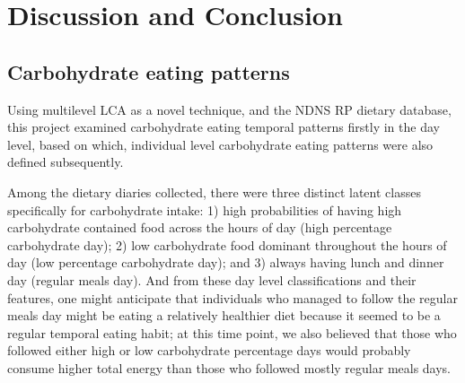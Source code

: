 
\chapter{Discussion and Conclusion} %

\label{Chapter 4} %







\section{Carbohydrate eating patterns}

Using multilevel LCA as a novel technique, and the NDNS RP dietary database, this project examined carbohydrate eating temporal patterns firstly in the day level, based on which, individual level carbohydrate eating patterns were also defined subsequently. 

Among the dietary diaries collected, there were three distinct latent classes specifically for carbohydrate intake: 1) high probabilities of having high carbohydrate contained food across the hours of day (high percentage carbohydrate day); 2) low carbohydrate food dominant throughout the hours of day (low percentage carbohydrate day); and 3) always having lunch and dinner day (regular meals day). And from these day level classifications and their features, one might anticipate that individuals who managed to follow the regular meals day might be eating a relatively healthier diet because it seemed to be a regular temporal eating habit; at this time point, we also believed that those who followed either high or low carbohydrate percentage days would probably consume higher total energy than those who followed mostly regular meals days. 

